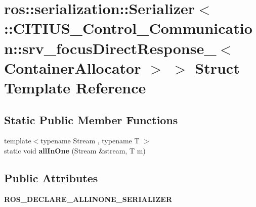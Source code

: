 \hypertarget{structros_1_1serialization_1_1_serializer_3_01_1_1_c_i_t_i_u_s___control___communication_1_1srv_62bbc7f3357c692ff48c6912a95c2e1f}{\section{ros\-:\-:serialization\-:\-:\-Serializer$<$ \-:\-:\-C\-I\-T\-I\-U\-S\-\_\-\-Control\-\_\-\-Communication\-:\-:srv\-\_\-focus\-Direct\-Response\-\_\-$<$ \-Container\-Allocator $>$ $>$ \-Struct \-Template \-Reference}
\label{structros_1_1serialization_1_1_serializer_3_01_1_1_c_i_t_i_u_s___control___communication_1_1srv_62bbc7f3357c692ff48c6912a95c2e1f}
}
\subsection*{\-Static \-Public \-Member \-Functions}
\begin{DoxyCompactItemize}
\item 
\hypertarget{structros_1_1serialization_1_1_serializer_3_01_1_1_c_i_t_i_u_s___control___communication_1_1srv_62bbc7f3357c692ff48c6912a95c2e1f_a98e7aa140bb7d074aee348f50fb11173}{{\footnotesize template$<$typename Stream , typename T $>$ }\\static void {\bfseries all\-In\-One} (\-Stream \&stream, \-T m)}\label{structros_1_1serialization_1_1_serializer_3_01_1_1_c_i_t_i_u_s___control___communication_1_1srv_62bbc7f3357c692ff48c6912a95c2e1f_a98e7aa140bb7d074aee348f50fb11173}

\end{DoxyCompactItemize}
\subsection*{\-Public \-Attributes}
\begin{DoxyCompactItemize}
\item 
\hypertarget{structros_1_1serialization_1_1_serializer_3_01_1_1_c_i_t_i_u_s___control___communication_1_1srv_62bbc7f3357c692ff48c6912a95c2e1f_ad437f562044e01b9b29e51330c23bc5b}{{\bfseries \-R\-O\-S\-\_\-\-D\-E\-C\-L\-A\-R\-E\-\_\-\-A\-L\-L\-I\-N\-O\-N\-E\-\_\-\-S\-E\-R\-I\-A\-L\-I\-Z\-E\-R}}\label{structros_1_1serialization_1_1_serializer_3_01_1_1_c_i_t_i_u_s___control___communication_1_1srv_62bbc7f3357c692ff48c6912a95c2e1f_ad437f562044e01b9b29e51330c23bc5b}

\end{DoxyCompactItemize}
